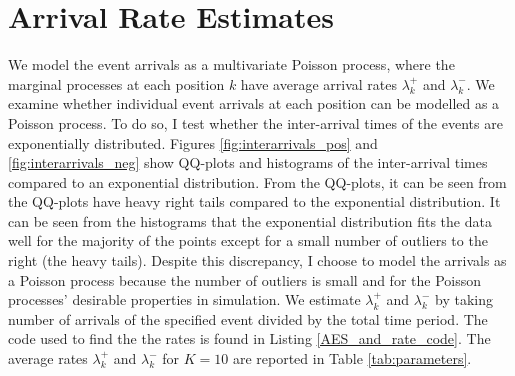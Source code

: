 \section{Arrival Rate Estimates}\label{ch:poisson}
We model the event arrivals as a multivariate Poisson process, where the marginal processes at each position $k$ have average arrival rates $\lambda^+_k$ and $\lambda^-_k$. We examine whether individual event arrivals at each position can be modelled as a Poisson process. To do so, I test whether the inter-arrival times of the events are exponentially distributed. Figures \ref{fig:interarrivals_pos} and \ref{fig:interarrivals_neg} show QQ-plots and histograms of the inter-arrival times compared to an exponential distribution. From the QQ-plots, it can be seen from the QQ-plots have heavy right tails compared to the exponential distribution. It can be seen from the histograms that the exponential distribution fits the data well for the majority of the points except for a small number of outliers to the right (the heavy tails). Despite this discrepancy, I choose to model the arrivals as a Poisson process because the number of outliers is small and for the Poisson processes' desirable properties in simulation. We  estimate $\lambda^+_k$ and $\lambda^-_k$ by taking number of arrivals of the specified event divided by the total time period. The code used to find the the rates is found in Listing \ref{AES_and_rate_code}. The average rates $\lambda^+_k$ and $\lambda^-_k$ for $K=10$ are reported in Table \ref{tab:parameters}.

